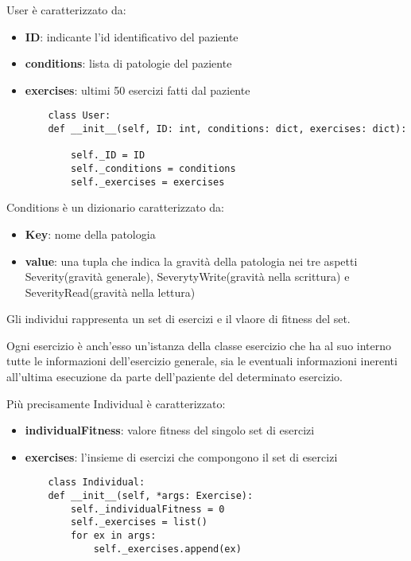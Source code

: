 \documentclass{article}
\begin{document}
User è caratterizzato da:
\begin{itemize}
\item\textbf{ID}: indicante l'id identificativo del paziente
\item\textbf{conditions}: lista di patologie del paziente
\item\textbf{exercises}: ultimi 50 esercizi fatti dal paziente
\begin{lstlisting}
    class User:
    def __init__(self, ID: int, conditions: dict, exercises: dict):
        
        self._ID = ID
        self._conditions = conditions
        self._exercises = exercises
\end{lstlisting}
\end{itemize}

\bigskip

Conditions è un dizionario caratterizzato da:
\begin{itemize}
\item\textbf{Key}: nome della patologia
\item\textbf{value}: una tupla che indica la gravità della patologia nei tre aspetti Severity(gravità generale), SeverytyWrite(gravità nella scrittura) e SeverityRead(gravità nella lettura)
\end{itemize}

Gli individui rappresenta un set di esercizi e il vlaore di fitness del set.

Ogni esercizio è anch'esso un'istanza della classe esercizio che ha al suo interno tutte le informazioni dell'esercizio generale, sia le eventuali informazioni inerenti all'ultima esecuzione da parte dell'paziente del determinato esercizio.

\bigskip

Più precisamente Individual è caratterizzato:
\begin{itemize}
\item\textbf{individualFitness}: valore fitness del singolo set di esercizi
\item\textbf{exercises}: l'insieme di esercizi che compongono il set di esercizi
\begin{lstlisting}
    class Individual:
    def __init__(self, *args: Exercise):
        self._individualFitness = 0
        self._exercises = list()
        for ex in args:
            self._exercises.append(ex)
\end{lstlisting}
\end{itemize}

\pagebreak
\end{document}
